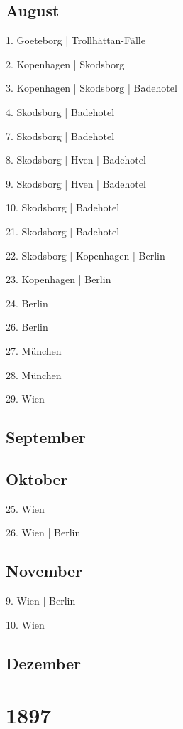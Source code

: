 \documentclass[twoside=false,titlepage=false,open=any, parskip=never, fontsize=10pt, headings=small, chapterprefix=false, appendixprefix=false, DIV=15]{scrbook}
\begin{document}
\begin{multicols}{3}
            \section*{August}
            1. Goeteborg | Trollhättan-Fälle\par
            2. Kopenhagen | Skodsborg\par
            3. Kopenhagen | Skodsborg | Badehotel\par
            4. Skodsborg | Badehotel\par
            7. Skodsborg | Badehotel\par
            8. Skodsborg | Hven | Badehotel\par
            9. Skodsborg | Hven | Badehotel\par
            10. Skodsborg | Badehotel\par
            21. Skodsborg | Badehotel\par
            22. Skodsborg | Kopenhagen | Berlin\par
            23. Kopenhagen | Berlin\par
            24. Berlin\par
            26. Berlin\par
            27. München\par
            28. München\par
            29. Wien\par
            \section*{September}
            \section*{Oktober}
            25. Wien\par
            26. Wien | Berlin\par
            \section*{November}
            9. Wien | Berlin\par
            10. Wien\par
            \section*{Dezember}
            \chapter*{1897}

\end{multicols}
\end{document}

